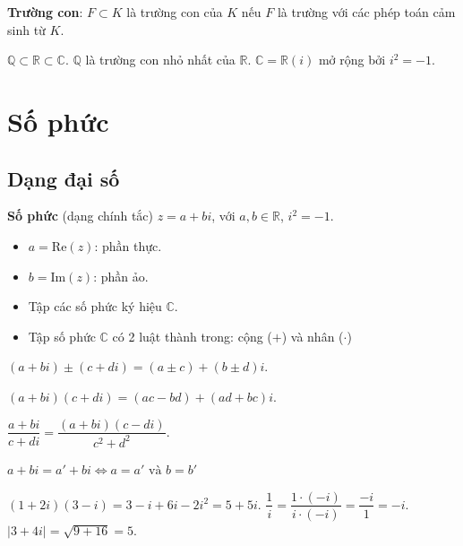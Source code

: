 \documentclass[12pt,a4paper]{article}
\begin{document}
\begin{dinhnghia}
  \textbf{Trường con}: $F \subset K$ là trường con của $K$ nếu $F$ là trường với các phép toán cảm sinh từ $K$.
\end{dinhnghia}

\begin{vidu}
  $\mathbb{Q} \subset \mathbb{R} \subset \mathbb{C}$. $\mathbb{Q}$ là trường con nhỏ nhất của $\mathbb{R}$. $\mathbb{C} = \mathbb{R}(i)$ mở rộng bởi $i^2 = -1$.
\end{vidu}

\section{Số phức}

\subsection{Dạng đại số}

\begin{dinhnghia}
  \textbf{Số phức} (dạng chính tắc) $z = a + bi$, với $a, b \in \mathbb{R}$, $i^2 = -1$.
  \begin{itemize}
    \item $a = \mathrm{Re}(z)$: phần thực.
    \item $b = \mathrm{Im}(z)$: phần ảo.
    \item Tập các số phức ký hiệu $\mathbb{C}$.
    \item Tập số phức $\mathbb{C}$ có 2 luật thành trong: cộng ($+$) và nhân ($\cdot$)
  \end{itemize}
\end{dinhnghia}

\begin{congthuc}[title={Các phép toán}]
  $(a+bi) \pm (c+di) = (a \pm c) + (b \pm d)i$.
  
  $(a+bi)(c+di) = (ac-bd) + (ad+bc)i$.
  
  $\dfrac{a+bi}{c+di} = \dfrac{(a+bi)(c-di)}{c^2+d^2}$.

  $a + bi = a' + bi \Leftrightarrow a = a' \text{ và } b = b'$
\end{congthuc}

\begin{vidu}
  $(1+2i)(3-i) = 3 - i + 6i - 2i^2 = 5 + 5i$. $\dfrac{1}{i} = \dfrac{1 \cdot (-i)}{i \cdot (-i)} = \dfrac{-i}{1} = -i$. $|3+4i| = \sqrt{9+16} = 5$.
\end{vidu}
\end{document}
